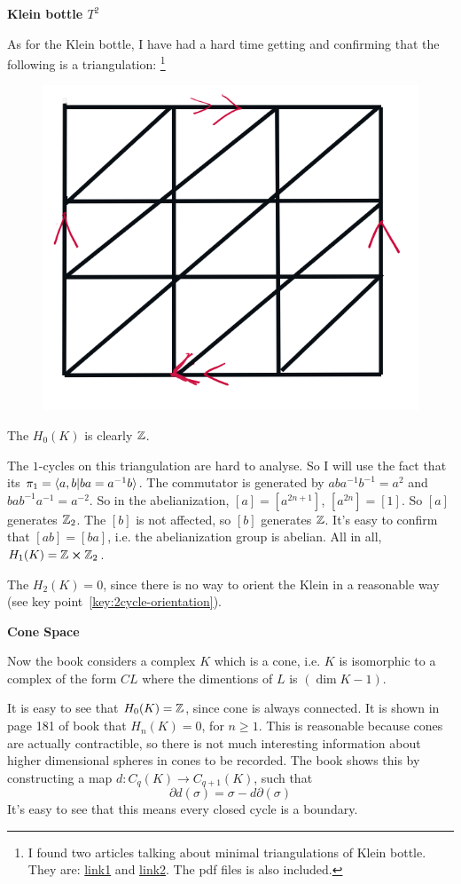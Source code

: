 \begin{ex} \textbf{Klein bottle $T^2$}

    As for the Klein bottle, I have had a hard time getting and
    confirming that the following is a triangulation:
    \footnote{
        I found two articles talking about minimal triangulations
        of Klein bottle. They are:
        \href{https://arxiv.org/abs/math/0407008}{link1}
        and
        \href{http://www.sciencedirect.com/science/article/pii/S0095895697999998}{link2}.
        The pdf files is also included.
    }
    \begin{figure}[H]
        \centering
        \includegraphics[width=0.6\linewidth]{pics/ch8/klein-tri.png}
    \end{figure}
    
    The $H_0(K)$ is clearly $\mathbb{Z}$.

    The $1$-cycles on this triangulation are hard to analyse. So I
    will use the fact that its $\pi_1=\braket{a,b|ba=a^{-1}b}$.
    The commutator is generated by $aba^{-1}b^{-1}=a^2$ and
    $bab^{-1}a^{-1}=a^{-2}$. So in the abelianization,
    $[a]=[a^{2n+1}]$, $[a^{2n}]=[1]$. So $[a]$ generates $\mathbb{Z}_2$. The
    $[b]$ is not affected, so $[b]$ generates $\mathbb{Z}$. It's easy to
    confirm that $[ab]=[ba]$, i.e. the abelianization group is
    abelian. All in all, $H_1(K)=\mathbb{Z}\cross\mathbb{Z}_2$.

    The $H_2(K)=0$, since there is no way to orient the Klein in a
    reasonable way (see key point~\ref{key:2cycle-orientation}).
\end{ex}

\begin{ex}\textbf{Cone Space}

    Now the book considers a complex $K$ which is a cone, i.e. $K$ is
    isomorphic to a complex of the form $CL$ where the dimentions of
    $L$ is $(\dim{K}-1)$.

    It is easy to see that $H_0(K)=\mathbb{Z}$, since cone is always
    connected.
    It is shown in page 181 of book\cite{book} that $H_n(K)=0$, for $n\geq
    1$. This is reasonable because cones are actually contractible, so
    there is not much interesting information about higher dimensional
    spheres in cones to be recorded. The book shows this by
    constructing a map $d:C_q(K)\to C_{q+1}(K)$, such that
    \begin{equation}
        \partial d(\sigma) = \sigma-d\partial(\sigma)
    \end{equation}
    It's easy to see that this means every closed cycle is a boundary.
\end{ex}

